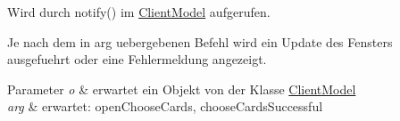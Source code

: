 Wird durch notify() im \hyperlink{a00003}{Client\-Model} aufgerufen. 

Je nach dem in arg uebergebenen Befehl wird ein Update des Fensters ausgefuehrt oder eine Fehlermeldung angezeigt.


\begin{DoxyParams}{Parameter}
{\em o} & erwartet ein Objekt von der Klasse \hyperlink{a00003}{Client\-Model} \\
\hline
{\em arg} & erwartet\-: open\-Choose\-Cards, choose\-Cards\-Successful \\
\hline
\end{DoxyParams}
